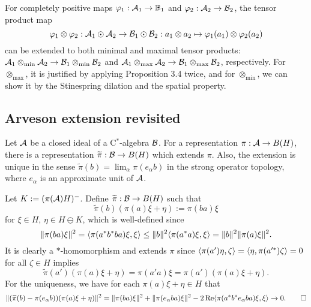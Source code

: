 \documentclass{../../small}
\begin{document}
\begin{rmk*}
For completely positive maps $\varphi_1:\mathcal{A}_1\to\mathbb{B}_1$ and $\varphi_2:\mathcal{A}_2\to\mathcal{B}_2$, the tensor product map
\[\varphi_1\otimes\varphi_2:\mathcal{A}_1\odot\mathcal{A}_2\to\mathcal{B}_1\odot\mathcal{B}_2:a_1\otimes a_2\mapsto\varphi_1(a_1)\otimes\varphi_2(a_2)\]
can be extended to both minimal and maximal tensor products: $\mathcal{A}_1\otimes_{\min}\mathcal{A}_2\to\mathcal{B}_1\otimes_{\min}\mathcal{B}_2$ and $\mathcal{A}_1\otimes_{\max}\mathcal{A}_2\to\mathcal{B}_1\otimes_{\max}\mathcal{B}_2$, respectively.
For $\otimes_{\max}$, it is justified by applying Proposition 3.4 twice, and for $\otimes_{\min}$, we can show it by the Stinespring dilation and the spatial property.
\end{rmk*}


\subsection{Arveson extension revisited}

\begin{prop}
Let $\mathcal{A}$ be a closed ideal of a C$^*$-algebra $\mathcal{B}$.
For a representation $\pi:\mathcal{A}\to B(H)$, there is a representation $\widetilde\pi:\mathcal{B}\to B(H)$ which extends $\pi$.
Also, the extension is unique in the sense $\tilde\pi(b)=\lim_\alpha\pi(e_\alpha b)$ in the strong operator topology, where $e_\alpha$ is an approximate unit of $\mathcal{A}$.
\end{prop}
\begin{pf}
Let $K:=(\pi(\mathcal{A})H)^-$.
Define $\widetilde\pi:\mathcal{B}\to B(H)$ such that
\[\tilde\pi(b)(\pi(a)\xi+\eta):=\pi(ba)\xi\]
for $\xi\in H$, $\eta\in H\ominus K$, which is well-defined since
\[\|\pi(ba)\xi\|^2=\langle\pi(a^*b^*ba)\xi,\xi\rangle\le\|b\|^2\langle\pi(a^*a)\xi,\xi\rangle=\|b\|^2\|\pi(a)\xi\|^2.\]
It is clearly a $*$-homomorphism and extends $\pi$ since $\langle\pi(a')\eta,\zeta\rangle=\langle\eta,\pi(a'^*)\zeta\rangle=0$ for all $\zeta\in H$ implies
\[\tilde\pi(a')(\pi(a)\xi+\eta)=\pi(a'a)\xi=\pi(a')(\pi(a)\xi+\eta).\]
For the uniqueness, we have for each $\pi(a)\xi+\eta\in H$ that
\[\|(\widetilde\pi(b)-\pi(e_\alpha b))(\pi(a)\xi+\eta)\|^2=\|\pi(ba)\xi\|^2+\|\pi(e_\alpha ba)\xi\|^2-2\operatorname{Re}\langle\pi(a^*b^*e_\alpha ba)\xi,\xi\rangle\to0.\qedhere\]
\end{pf}
\end{document}
